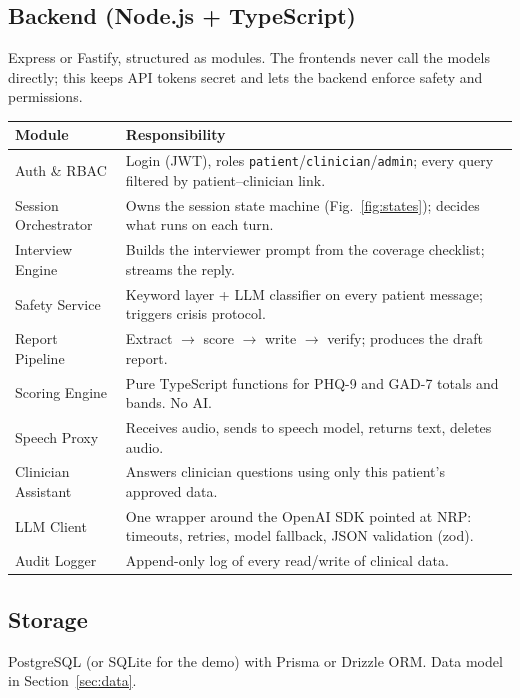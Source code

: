 \documentclass[11pt]{article}
\begin{document}
\subsection{Backend (Node.js + TypeScript)}
Express or Fastify, structured as modules. The frontends never call the models directly; this keeps API tokens secret
and lets the backend enforce safety and permissions.

\medskip
\renewcommand{\arraystretch}{1.2}
\begin{tabularx}{\textwidth}{@{}l X@{}}
\toprule
\textbf{Module} & \textbf{Responsibility} \\
\midrule
Auth \& RBAC & Login (JWT), roles \texttt{patient}/\texttt{clinician}/\texttt{admin}; every query filtered by patient--clinician link. \\
Session Orchestrator & Owns the session state machine (Fig.~\ref{fig:states}); decides what runs on each turn. \\
Interview Engine & Builds the interviewer prompt from the coverage checklist; streams the reply. \\
Safety Service & Keyword layer + LLM classifier on every patient message; triggers crisis protocol. \\
Report Pipeline & Extract $\rightarrow$ score $\rightarrow$ write $\rightarrow$ verify; produces the draft report. \\
Scoring Engine & Pure TypeScript functions for PHQ-9 and GAD-7 totals and bands. No AI. \\
Speech Proxy & Receives audio, sends to speech model, returns text, deletes audio. \\
Clinician Assistant & Answers clinician questions using only this patient's approved data. \\
LLM Client & One wrapper around the OpenAI SDK pointed at NRP: timeouts, retries, model fallback, JSON validation (zod). \\
Audit Logger & Append-only log of every read/write of clinical data. \\
\bottomrule
\end{tabularx}
\renewcommand{\arraystretch}{1.0}

\subsection{Storage}
PostgreSQL (or SQLite for the demo) with Prisma or Drizzle ORM. Data model in Section~\ref{sec:data}.

\end{document}
